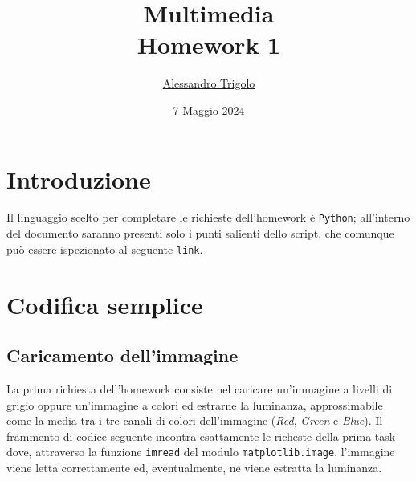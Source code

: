 \title{\vspace{160px} \textbf{\huge{Multimedia}} \\\vspace{17.5px} \LARGE{Homework 1}  \vspace{10px}}
\author{\href{https://github.com/imAlessas}{Alessandro Trigolo}}
\date{7 Maggio 2024}



\maketitle\newpage

\tableofcontents
\listoffigures
\vspace{20px}
\newpage

\listoftodos\newpage


\section*{Introduzione}
Il linguaggio scelto per completare le richieste dell'homework è \texttt{Python}; all'interno del documento saranno presenti solo i punti salienti dello script, che comunque può essere ispezionato al seguente \href{https://github.com/imAlessas/computer-networks/blob/main/multimedia/hw-1/script/lossless_coding.py}{\texttt{link}}.


\section{Codifica semplice} 

\vspace{15px}\subsection{Caricamento dell'immagine}
La prima richiesta dell'homework consiste nel caricare un'immagine a livelli di grigio oppure un'immagine a colori ed estrarne la luminanza, approssimabile come la media tra i tre canali di colori dell'immagine (\textsl{Red}, \textsl{Green} e \textsl{Blue}). Il frammento di codice seguente incontra esattamente le richeste della prima task dove, attraverso la funzione \texttt{imread} del modulo \texttt{matplotlib.image}, l'immagine viene letta correttamente ed, eventualmente, ne viene estratta la luminanza.

